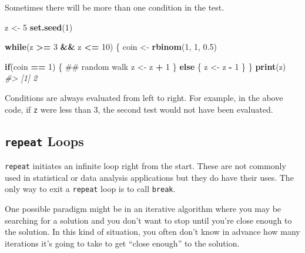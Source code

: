 \documentclass[]{book}
\newenvironment{Shaded}{\begin{snugshade}}{\end{snugshade}}
\newcommand{\CommentTok}[1]{\textcolor[rgb]{0.56,0.35,0.01}{\textit{#1}}}
\newcommand{\ControlFlowTok}[1]{\textcolor[rgb]{0.13,0.29,0.53}{\textbf{#1}}}
\newcommand{\DecValTok}[1]{\textcolor[rgb]{0.00,0.00,0.81}{#1}}
\newcommand{\FloatTok}[1]{\textcolor[rgb]{0.00,0.00,0.81}{#1}}
\newcommand{\KeywordTok}[1]{\textcolor[rgb]{0.13,0.29,0.53}{\textbf{#1}}}
\newcommand{\NormalTok}[1]{#1}
\newcommand{\OperatorTok}[1]{\textcolor[rgb]{0.81,0.36,0.00}{\textbf{#1}}}
\newcommand{\StringTok}[1]{\textcolor[rgb]{0.31,0.60,0.02}{#1}}
\theoremstyle{definition}
\theoremstyle{definition}
\theoremstyle{definition}
\theoremstyle{remark}
\begin{document}
Sometimes there will be more than one condition in the test.

\begin{Shaded}
\begin{Highlighting}[]
\NormalTok{z <-}\StringTok{ }\DecValTok{5}
\KeywordTok{set.seed}\NormalTok{(}\DecValTok{1}\NormalTok{)}

\ControlFlowTok{while}\NormalTok{(z }\OperatorTok{>=}\StringTok{ }\DecValTok{3} \OperatorTok{&&}\StringTok{ }\NormalTok{z }\OperatorTok{<=}\StringTok{ }\DecValTok{10}\NormalTok{) \{}
\NormalTok{        coin <-}\StringTok{ }\KeywordTok{rbinom}\NormalTok{(}\DecValTok{1}\NormalTok{, }\DecValTok{1}\NormalTok{, }\FloatTok{0.5}\NormalTok{)}
        
        \ControlFlowTok{if}\NormalTok{(coin }\OperatorTok{==}\StringTok{ }\DecValTok{1}\NormalTok{) \{  ## random walk}
\NormalTok{                z <-}\StringTok{ }\NormalTok{z }\OperatorTok{+}\StringTok{ }\DecValTok{1}
\NormalTok{        \} }\ControlFlowTok{else}\NormalTok{ \{}
\NormalTok{                z <-}\StringTok{ }\NormalTok{z }\OperatorTok{-}\StringTok{ }\DecValTok{1}
\NormalTok{        \} }
\NormalTok{\}}
\KeywordTok{print}\NormalTok{(z)}
\CommentTok{#> [1] 2}
\end{Highlighting}
\end{Shaded}

Conditions are always evaluated from left to right. For example, in the
above code, if \texttt{z} were less than 3, the second test would not
have been evaluated.

\hypertarget{repeat-loops}{%
\subsection{\texorpdfstring{\texttt{repeat}
Loops}{repeat Loops}}\label{repeat-loops}}

\texttt{repeat} initiates an infinite loop right from the start. These
are not commonly used in statistical or data analysis applications but
they do have their uses. The only way to exit a \texttt{repeat} loop is
to call \texttt{break}.

One possible paradigm might be in an iterative algorithm where you may
be searching for a solution and you don't want to stop until you're
close enough to the solution. In this kind of situation, you often don't
know in advance how many iterations it's going to take to get ``close
enough'' to the solution.
\end{document}
